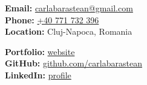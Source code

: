 \documentclass[10pt]{spidercv}
\begin{document}
\begin{TopBar}{\ColorTextSide}

  \begin{DoubleColumns}
    {\small\RaggedRight
      \textbf{Email:} \href{mailto:carlabarastean@gmail.com}{carlabarastean@gmail.com}\\[0.12cm]
      \textbf{Phone:} \href{tel:+40771732396}{+40 771 732 396}\\[0.12cm]
      \textbf{Location:} Cluj-Napoca, Romania
      \par}
    \nextcolumn
    {\small\RaggedRight
      \textbf{Portfolio:} \href{https://portofolio-carla-barastean.netlify.app}{website}\\[0.12cm]
      \textbf{GitHub:} \href{https://github.com/carlabarastean}{github.com/carlabarastean}\\[0.12cm]
      \textbf{LinkedIn:} \href{https://www.linkedin.com/in/carla-barastean-621326269/}{profile}
      \par}
  \end{DoubleColumns}
\end{TopBar}
\end{document}
